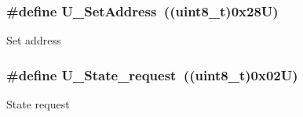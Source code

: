 \subsubsection[{\texorpdfstring{U\+\_\+\+Set\+Address}{U_SetAddress}}]{\setlength{\rightskip}{0pt plus 5cm}\#define U\+\_\+\+Set\+Address~((uint8\+\_\+t)0x28\+U)}\hypertarget{group___u_a_r_t___control___to_ga1b727950a6079fa1f299e08204ad8923}{}\label{group___u_a_r_t___control___to_ga1b727950a6079fa1f299e08204ad8923}
Set address 
\subsubsection[{\texorpdfstring{U\+\_\+\+State\+\_\+request}{U_State_request}}]{\setlength{\rightskip}{0pt plus 5cm}\#define U\+\_\+\+State\+\_\+request~((uint8\+\_\+t)0x02\+U)}\hypertarget{group___u_a_r_t___control___to_ga8dda3117e8869a900e5c5fe6f1b3a768}{}\label{group___u_a_r_t___control___to_ga8dda3117e8869a900e5c5fe6f1b3a768}
State request 